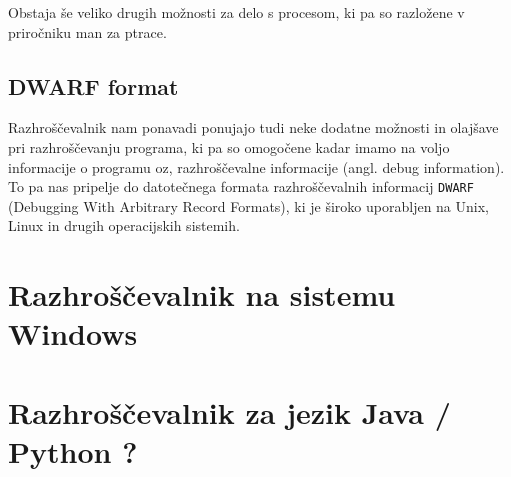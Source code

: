 \documentclass[a4paper,notitlepage]{article}
\newcommand{\code}[1]{\texttt{#1}}
\begin{document}
Obstaja še veliko drugih možnosti za delo s procesom, ki pa so razložene v priročniku man za ptrace\cite{ptrace-man-page}.

\subsection{DWARF format}

Razhroščevalnik nam ponavadi ponujajo tudi neke dodatne možnosti in olajšave pri razhroščevanju programa, ki pa so omogočene kadar imamo na voljo informacije o programu oz, razhroščevalne informacije (angl. debug information).
To pa nas pripelje do datotečnega formata razhroščevalnih informacij \code{DWARF} (Debugging With Arbitrary Record Formats)\cite{dwarf-web-page}, ki je široko uporabljen na Unix, Linux in drugih operacijskih sistemih.



\section{Razhroščevalnik na sistemu Windows}


\section{Razhroščevalnik za jezik Java / Python ?}

\nocite{*} %


\end{document}
